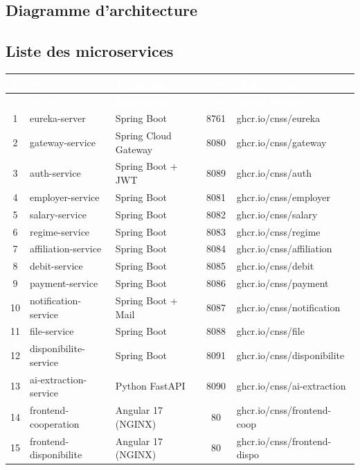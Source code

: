 \documentclass[12pt,a4paper]{article}
\begin{document}
\subsection{Diagramme d'architecture}

\begin{center}
    \fbox{}
\end{center}

\subsection{Liste des microservices}

\begin{center}
\begin{longtable}{|c|l|l|c|l|}
\hline
\rowcolor{primary}
\textcolor{white}{\textbf{\#}} & \textcolor{white}{\textbf{Service}} & \textcolor{white}{\textbf{Technologie}} & \textcolor{white}{\textbf{Port}} & \textcolor{white}{\textbf{Image Docker}} \\
\hline
\endfirsthead
\hline
\rowcolor{primary}
\textcolor{white}{\textbf{\#}} & \textcolor{white}{\textbf{Service}} & \textcolor{white}{\textbf{Technologie}} & \textcolor{white}{\textbf{Port}} & \textcolor{white}{\textbf{Image Docker}} \\
\hline
\endhead
1 & eureka-server & Spring Boot & 8761 & ghcr.io/cnss/eureka \\
2 & gateway-service & Spring Cloud Gateway & 8080 & ghcr.io/cnss/gateway \\
3 & auth-service & Spring Boot + JWT & 8089 & ghcr.io/cnss/auth \\
4 & employer-service & Spring Boot & 8081 & ghcr.io/cnss/employer \\
5 & salary-service & Spring Boot & 8082 & ghcr.io/cnss/salary \\
6 & regime-service & Spring Boot & 8083 & ghcr.io/cnss/regime \\
7 & affiliation-service & Spring Boot & 8084 & ghcr.io/cnss/affiliation \\
8 & debit-service & Spring Boot & 8085 & ghcr.io/cnss/debit \\
9 & payment-service & Spring Boot & 8086 & ghcr.io/cnss/payment \\
10 & notification-service & Spring Boot + Mail & 8087 & ghcr.io/cnss/notification \\
11 & file-service & Spring Boot & 8088 & ghcr.io/cnss/file \\
12 & disponibilite-service & Spring Boot & 8091 & ghcr.io/cnss/disponibilite \\
13 & ai-extraction-service & Python FastAPI & 8090 & ghcr.io/cnss/ai-extraction \\
14 & frontend-cooperation & Angular 17 (NGINX) & 80 & ghcr.io/cnss/frontend-coop \\
15 & frontend-disponibilite & Angular 17 (NGINX) & 80 & ghcr.io/cnss/frontend-dispo \\
\hline
\end{longtable}
\end{center}
\end{document}
